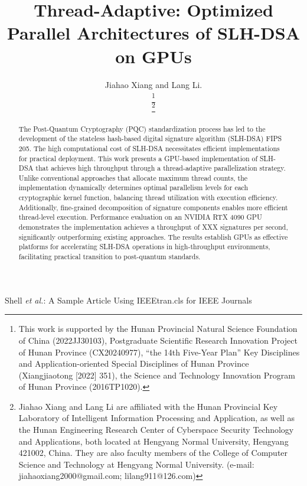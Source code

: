 \documentclass[journal]{IEEEtran}
\begin{document}
\title{Thread-Adaptive: Optimized Parallel Architectures of SLH-DSA on GPUs}

\author{Jiahao Xiang and Lang Li.

  \thanks{This work is supported by the Hunan Provincial Natural Science Foundation of China (2022JJ30103), Postgraduate Scientific Research Innovation Project of Hunan Province (CX20240977), “the 14th Five-Year Plan” Key Disciplines and Application-oriented Special Disciplines of Hunan Province (Xiangjiaotong [2022] 351), the Science and Technology Innovation Program of Hunan Province (2016TP1020).}

  \thanks{Jiahao Xiang and Lang Li are affiliated with the Hunan Provincial Key Laboratory of Intelligent Information Processing and Application, as well as the Hunan Engineering Research Center of Cyberspace Security Technology and Applications, both located at Hengyang Normal University, Hengyang 421002, China. They are also faculty members of the College of Computer Science and Technology at Hengyang Normal University. (e-mail: jiahaoxiang2000@gmail.com; lilang911@126.com)}%
}

%
{Shell \MakeLowercase{\textit{et al.}}: A Sample Article Using IEEEtran.cls for IEEE Journals}

\IEEEpubid{}

\maketitle

\begin{abstract}
  The Post-Quantum Cryptography (PQC) standardization process has led to the development of the stateless hash-based digital signature algorithm (SLH-DSA) FIPS 205. The high computational cost of SLH-DSA necessitates efficient implementations for practical deployment. This work presents a GPU-based implementation of SLH-DSA that achieves high throughput through a thread-adaptive parallelization strategy. Unlike conventional approaches that allocate maximum thread counts, the implementation dynamically determines optimal parallelism levels for each cryptographic kernel function, balancing thread utilization with execution efficiency. Additionally, fine-grained decomposition of signature components enables more efficient thread-level execution. Performance evaluation on an NVIDIA RTX 4090 GPU demonstrates the implementation achieves a throughput of XXX signatures per second, significantly outperforming existing approaches. The results establish GPUs as effective platforms for accelerating SLH-DSA operations in high-throughput environments, facilitating practical transition to post-quantum standards.
\end{abstract}
\end{document}
